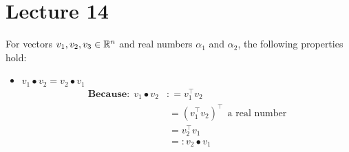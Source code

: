 \documentclass[letterpaper]{book}
\begin{document}
\newpage
\section{Lecture 14}

\begin{tcolorbox}[title={\bf \Large Properties of the Dot (or Inner) Product}]
\Large 
For vectors $v_1, v_2, v_3 \in \mathbb R^n$ and real numbers $\alpha_1$ and $\alpha_2$, the following properties hold:

\vspace*{1cm}

\begin{itemize}
\setlength{\itemsep}{.3cm}
    \item $v_1 \bullet v_2 = v_2 \bullet v_1$ 
    \begin{align*}
       \textbf{Because:}~~ v_1 \bullet v_2 &: = v_1^\top v_2   \\
         &~= (v_1^\top v_2)^\top ~~\text{a real number}\\
        &~=v_2^\top v_1\\
         &~ =:  v_2 \bullet v_1 
    \end{align*}


\end{itemize}
\end{tcolorbox}
\end{document}

